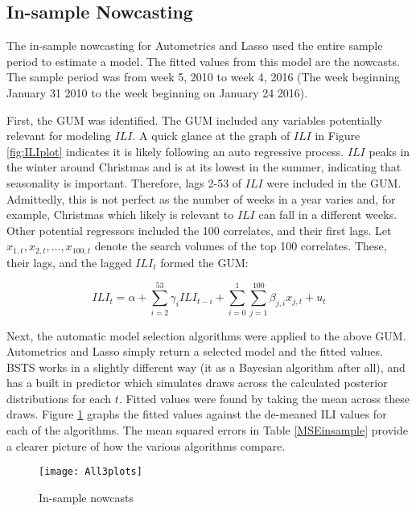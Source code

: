 \documentclass[11pt, oneside]{book}   	%
\begin{document}
\subsection{In-sample Nowcasting}
The in-sample nowcasting for Autometrics and Lasso used the entire sample period to estimate a model. The fitted values from this model are the nowcasts. The sample period was from week 5, 2010 to week 4, 2016 (The week beginning January 31 2010 to the week beginning on January 24 2016).

First, the GUM was identified. The GUM included any variables potentially relevant for modeling $ILI$. A quick glance at the graph of $ILI$ in Figure \ref{fig:ILIplot} indicates it is likely following an auto regressive process. $ILI$ peaks in the winter around Christmas and is at its lowest in the summer, indicating that seasonality is important. Therefore, lags 2-53 of $ILI$ were included in the GUM. Admittedly, this is not perfect as the number of weeks in a year varies and, for example, Christmas which likely is relevant to $ILI$ can fall in a different weeks. Other potential regressors included the 100 correlates, and their first lags.  Let $x_{1,t}, x_{2,t},...,x_{100,t}$ denote the search volumes of the top 100 correlates. These, their lags, and the lagged $ILI_{t}$ formed the GUM:

$$ILI_{t}= \alpha + \sum_{i=2}^{53}\gamma_{i}ILI_{t-i}+ \sum_{i=0}^{1}\sum_{j=1}^{100}\beta_{j,i}x_{j,t}+u_{t}$$

Next, the automatic model selection algorithms were applied to the above GUM. Autometrics and Lasso simply return a selected model and the fitted values. BSTS works in a slightly different way (it as a Bayesian algorithm after all), and has a built in predictor which simulates draws across the calculated posterior distributions for each $t$. Fitted values were found by taking the mean across these draws. Figure \ref{fig:InSample} graphs the fitted values against the de-meaned ILI values for each of the algorithms. The mean squared errors in Table \ref{MSEinsample} provide a clearer picture of how the various algorithms compare.   


\begin{landscape}
\begin{figure}
\centering
\texttt{[image: All3plots]}
\caption{In-sample nowcasts}
\label{fig:InSample}
\end{figure}
\end{landscape}
\end{document}
